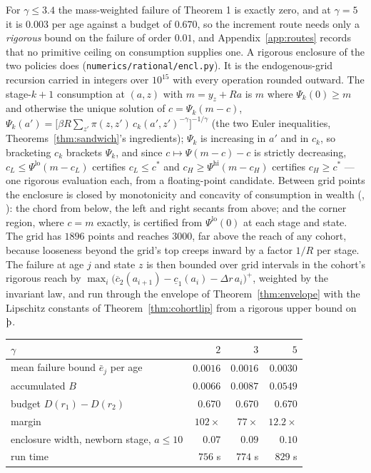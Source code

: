 For $\gamma\le3.4$ the mass-weighted failure of Theorem 1 is exactly zero, and at $\gamma=5$ it is
$0.003$ per age against a budget of $0.670$, so the increment route needs only a \emph{rigorous}
bound on the failure of order $0.01$, and Appendix~\ref{app:routes} records that no primitive ceiling
on consumption supplies one. A rigorous enclosure of the two policies does
(\texttt{numerics/rational/encl.py}). It is the endogenous-grid recursion carried in integers over
$10^{15}$ with every operation rounded outward. The stage-$k+1$ consumption at $(a,z)$ with
$m=y_z+Ra$ is $m$ where $\Psi_k(0)\ge m$ and otherwise the unique solution of $c=\Psi_k(m-c)$,
$\Psi_k(a')=\bigl[\beta R\sum_{z'}\pi(z,z')\,c_k(a',z')^{-\gamma}\bigr]^{-1/\gamma}$ (the two Euler
inequalities, Theorems~\ref{thm:sandwich}'s ingredients); $\Psi_k$ is increasing in $a'$ and in
$c_k$, so bracketing $c_k$ brackets $\Psi_k$, and since $c\mapsto\Psi(m-c)-c$ is strictly decreasing,
$c_L\le\Psi^{\mathrm{lo}}(m-c_L)$ certifies $c_L\le c^*$ and $c_H\ge\Psi^{\mathrm{hi}}(m-c_H)$
certifies $c_H\ge c^*$ --- one rigorous evaluation each, from a floating-point candidate. Between grid
points the enclosure is closed by monotonicity and concavity of consumption in wealth
(, ): the chord from below, the
left and right secants from above; and the corner region, where $c=m$ exactly, is certified from
$\Psi^{\mathrm{lo}}(0)$ at each stage and state. The grid has $1896$ points and reaches $3000$,
far above the reach of any cohort, because looseness beyond the grid's top creeps inward by a factor
$1/R$ per stage. The failure at age $j$ and state $z$ is then bounded over grid intervals in the
cohort's rigorous reach by $\max_i\bigl(\overline c_2(a_{i+1})-\underline c_1(a_i)-\Delta r\,a_i\bigr)^+$,
weighted by the invariant law, and run through the envelope of Theorem~\ref{thm:envelope} with the
Lipschitz constants of Theorem~\ref{thm:cohortlip} from a rigorous upper bound on $\Thorn$.

\begin{center}
\begin{tabular}{lrrr}
\toprule
$\gamma$ & $2$ & $3$ & $5$\\
\midrule
mean failure bound $\bar e_j$ per age & $0.0016$ & $0.0016$ & $0.0030$\\
accumulated $B$ & $0.0066$ & $0.0087$ & $0.0549$\\
budget $D(r_1)-D(r_2)$ & $0.670$ & $0.670$ & $0.670$\\
margin & $102\times$ & $77\times$ & $12.2\times$\\
enclosure width, newborn stage, $a\le10$ & $0.07$ & $0.09$ & $0.10$\\
run time & $756$ s & $774$ s & $829$ s\\
\bottomrule
\end{tabular}
\end{center}

